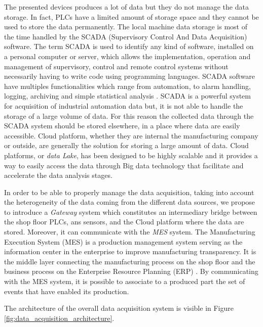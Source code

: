 The presented devices produces a lot of data but they do not manage the data storage. In fact, PLCs have a limited amount of storage space and they cannot be used to store the data permanently. The local machine data storage is most of the time handled by the SCADA (Supervisory Control And Data Acquisition) software. The term SCADA is used to identify any kind of software, installed on a personal computer or server, which allows the implementation, operation and management of supervisory, control and remote control systems without necessarily having to write code using programming languages. SCADA software have multiples functionalities which range from automation, to alarm handling, logging, archiving and simple statistical analysis \citep{daneels1999scada}. SCADA is a powerful system for acquisition of industrial automation data but, it is not able to handle the storage of a large volume of data. For this reason the collected data through the SCADA system should be stored elsewhere, in a place where data are easily accessible. Cloud platform, whether they are internal the manufacturing company or outside, are generally the solution for storing a large amount of data. Cloud platforms, or \textit{data Lake}, has been designed to be highly scalable and it provides a way to easily access the data through Big data technology that facilitate and accelerate the data analysis stages.  

In order to be able to properly manage the data acquisition, taking into account the heterogeneity of the data coming from the different data sources, we propose to introduce a \textit{Gateway} system which constitutes an intermediary bridge between the shop floor PLCs, ans sensors, and the Cloud platform where the data are stored. Moreover, it can communicate with the \textit{MES} system. The Manufacturing Execution System (MES) is a production management system serving as the information center in the enterprise to improve manufacturing transparency. It is the middle layer connecting the manufacturing process on the shop floor and the business process on the Enterprise Resource Planning (ERP) \citep{chen2020implementation}. By communicating with the MES system, it is possible to associate to a produced part the set of events that have enabled its production.

The architecture of the overall data acquisition system is visible in Figure \ref{fig:data_acquisition_architecture}.

